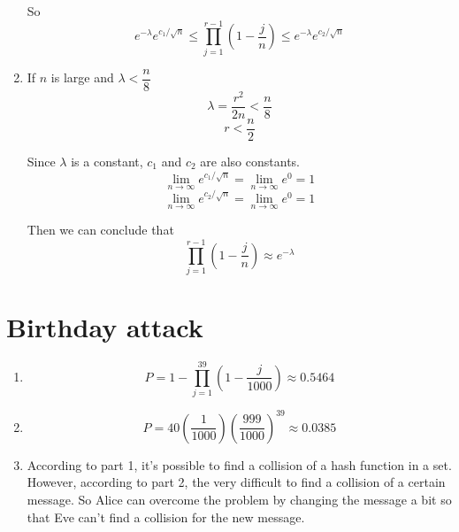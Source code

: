 \documentclass{article}
\begin{document}
\begin{enumerate}
So $$e^{-\lambda}e^{c_1/\sqrt{n}} \leqslant \prod_{j=1}^{r-1} \left(1-\frac{j}{n}\right) \leqslant e^{-\lambda}e^{c_2/\sqrt{n}}$$

\item
If $n$ is large and $\lambda<\dfrac{n}{8}$
$$\lambda=\frac{r^2}{2n}<\frac{n}{8}$$
$$r<\frac{n}{2}$$

Since $\lambda$ is a constant, $c_1$ and $c_2$ are also constants.
$$\lim_{n\to\infty}e^{c_1/\sqrt{n}}=\lim_{n\to\infty}e^0=1$$
$$\lim_{n\to\infty}e^{c_2/\sqrt{n}}=\lim_{n\to\infty}e^0=1$$

Then we can conclude that
$$\prod_{j=1}^{r-1} \left(1-\frac{j}{n}\right) \approx e^{-\lambda}$$
\end{enumerate}

\section{Birthday attack}
\begin{enumerate}
\item
$$P=1-\prod_{j=1}^{39}\left(1-\frac{j}{1000}\right)\approx0.5464$$
\item
$$P=40\left(\frac{1}{1000}\right)\left(\frac{999}{1000}\right)^{39}\approx0.0385$$
\item
According to part 1, it's possible to find a collision of a hash function in a set. However, according to part 2, the very difficult to find a collision of a certain message. So Alice can overcome the problem by changing the message a bit so that Eve can't find a collision for the new message.

\end{enumerate}
\end{document}
